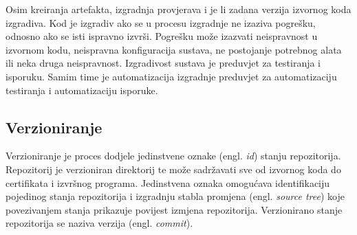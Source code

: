 \documentclass[times, utf8, diplomski, numeric]{fer}
\newcommand{\eng}[1]{(engl. \textit{#1})}
\begin{document}
Osim kreiranja artefakta, izgradnja provjerava i je li zadana verzija izvornog koda izgradiva. Kod je izgradiv ako se u procesu izgradnje ne izaziva pogrešku, odnosno ako se isti ispravno izvrši. Pogrešku može izazvati neispravnost u izvornom kodu, neispravna konfiguracija sustava, ne postojanje potrebnog alata ili neka druga neispravnost. Izgradivost sustava je preduvjet za  testiranja i isporuku. Samim time je automatizacija izgradnje preduvjet za automatizaciju testiranja i automatizaciju isporuke.

\subsection{Verzioniranje}

Verzioniranje je proces dodjele jedinstvene oznake \eng{id} stanju repozitorija\citep{wiki:SoftwareVersioning}. Repozitorij je verzioniran direktorij te može sadržavati sve od izvornog koda do certifikata i izvršnog programa. Jedinstvena oznaka omogućava identifikaciju pojedinog stanja repozitorija i izgradnju stabla promjena \eng{source tree} koje povezivanjem stanja prikazuje povijest izmjena repozitorija. Verzionirano stanje repozitorija se naziva verzija \eng{commit}.
\end{document}

